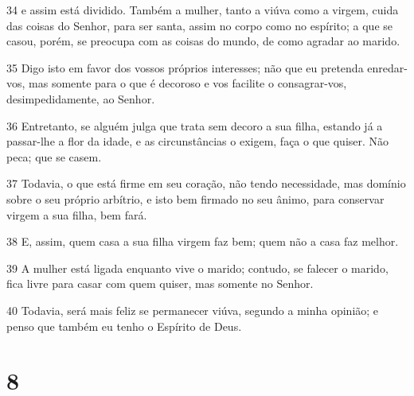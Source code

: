 \par 34 e assim está dividido. Também a mulher, tanto a viúva como a virgem, cuida das coisas do Senhor, para ser santa, assim no corpo como no espírito; a que se casou, porém, se preocupa com as coisas do mundo, de como agradar ao marido.
\par 35 Digo isto em favor dos vossos próprios interesses; não que eu pretenda enredar-vos, mas somente para o que é decoroso e vos facilite o consagrar-vos, desimpedidamente, ao Senhor.
\par 36 Entretanto, se alguém julga que trata sem decoro a sua filha, estando já a passar-lhe a flor da idade, e as circunstâncias o exigem, faça o que quiser. Não peca; que se casem.
\par 37 Todavia, o que está firme em seu coração, não tendo necessidade, mas domínio sobre o seu próprio arbítrio, e isto bem firmado no seu ânimo, para conservar virgem a sua filha, bem fará.
\par 38 E, assim, quem casa a sua filha virgem faz bem; quem não a casa faz melhor.
\par 39 A mulher está ligada enquanto vive o marido; contudo, se falecer o marido, fica livre para casar com quem quiser, mas somente no Senhor.
\par 40 Todavia, será mais feliz se permanecer viúva, segundo a minha opinião; e penso que também eu tenho o Espírito de Deus.

\chapter{8}

